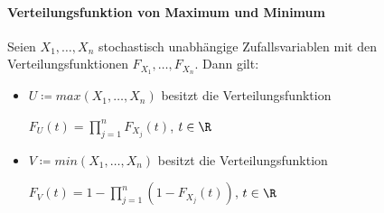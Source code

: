 \paragraph{Verteilungsfunktion von Maximum und Minimum}
Seien $X_1,\ldots,X_n$  stochastisch unabhängige Zufallsvariablen mit den Verteilungsfunktionen $F_{X_1},\ldots,F_{X_n}$.
Dann gilt:
\begin{itemize}
	\item $U\coloneqq max(X_1,\ldots,X_n)$ besitzt die Verteilungsfunktion 
	\begin{tightcenter}
		$F_U(t)=\prod\limits_{j=1}^{n}F_{X_j}(t)$, \qquad $t\in\R$
	\end{tightcenter}
	\item $V\coloneqq min(X_1,\ldots,X_n)$ besitzt die Verteilungsfunktion 
	\begin{tightcenter}
		$F_V(t)=1-\prod\limits_{j=1}^{n}(1-F_{X_j}(t))$, \qquad $t\in\R$
	\end{tightcenter}
\end{itemize}